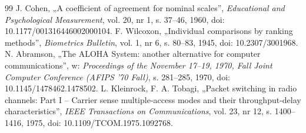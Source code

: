 \documentclass[12pt,a4paper,twoside]{report}
\theoremstyle{definition} %
\begin{document}
\begin{thebibliography}{99}
     J. Cohen, „A coefficient of agreement for nominal scales”, \emph{Educational and Psychological Measurement}, vol. 20, nr 1, s. 37--46, 1960, doi: 10.1177/001316446002000104.
     F. Wilcoxon, „Individual comparisons by ranking methods”, \emph{Biometrics Bulletin}, vol. 1, nr 6, s. 80--83, 1945, doi: 10.2307/3001968.
     N. Abramson, „The ALOHA System: another alternative for computer communications”, w: \emph{Proceedings of the November 17--19, 1970, Fall Joint Computer Conference (AFIPS '70 Fall)}, s. 281--285, 1970, doi: 10.1145/1478462.1478502.
     L. Kleinrock, F. A. Tobagi, „Packet switching in radio channels: Part I -- Carrier sense multiple-access modes and their throughput-delay characteristics”, \emph{IEEE Transactions on Communications}, vol. 23, nr 12, s. 1400--1416, 1975, doi: 10.1109/TCOM.1975.1092768.
	\end{thebibliography}
    \cleardoublepage

    \renewcommand{\listfigurename}{\LARGE Spis rysunków}
    \listoffigures
    \cleardoublepage

    \renewcommand{\listtablename}{\LARGE Spis tabel}
    \listoftables
    \cleardoublepage

	

    

	

    \cleardoublepage
	
    \thispagestyle{empty}

    \cleardoublepage
	
	
\end{document}

